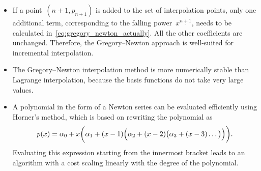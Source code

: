 \begin{itemize}
    \item
        If a point~$(n+1, p_{n+1})$ is added to the set of interpolation points,
        only one additional term, corresponding to the falling power~$x^{\underline{n+1}}$,
        needs to be calculated in~\eqref{eq:gregory_newton_actually}.
        All the other coefficients are unchanged.
        Therefore, the Gregory--Newton approach is well-suited for incremental interpolation.

    \item
        The Gregory--Newton interpolation method is more numerically stable than Lagrange interpolation,
        because the basis functions do not take very large values.

    \item
        A polynomial in the form of a Newton series can be evaluated efficiently using Horner's method,
        which is based on rewriting the polynomial as
        \[
            p(x) = \alpha_0 + x \biggl( \alpha_1 + (x-1)  \Bigl( \alpha_2 + (x-2)\bigl(\alpha_3 + (x-3) \dotsc \bigr) \Bigr)  \biggr).
        \]
        Evaluating this expression starting from the innermost bracket leads to an algorithm with a cost scaling linearly with the degree of the polynomial.
\end{itemize}

